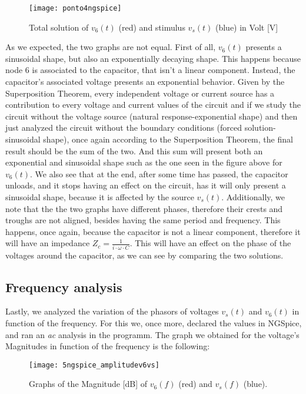 \FloatBarrier
\begin{figure}[h] \centering
	\texttt{[image: ponto4ngspice]}
	\caption{Total solution of $v_6(t)$ (red) and stimulus $v_s(t)$ (blue) in Volt [V]}
	\label{fig:sim4}
\end{figure}
\FloatBarrier

As we expected, the two graphs are not equal. First of all, $v_6(t)$ presents a sinusoidal shape, but also an exponentially decaying shape. This happens because node 6 is associated to the capacitor, that isn't a linear component. Instead, the capacitor's associated voltage presents an exponential behavior. Given by the Superposition Theorem, every independent voltage or current source has a contribution to every voltage and current values of the circuit and if we study the circuit without the voltage source (natural response-exponential shape) and then just analyzed the circuit without the boundary conditions (forced solution-sinusoidal shape), once again according to the Superposition Theorem, the final result should be the sum of the two. And this sum will present both an exponential and sinusoidal shape such as the one seen in the figure above for $v_6(t)$.
We also see that at the end, after some time has passed, the capacitor unloads, and it stops having an effect on the circuit, has it will only present a sinusoidal shape, because it is affected by the source $v_s(t)$.
Additionally, we note that the the two graphs have different phases, therefore their crests and troughs are not aligned, besides having the same period and frequency. This happens, once again, because the capacitor is not a linear component, therefore it will have an impedance $Z_{c}=\frac{1}{i\cdot \omega \cdot C}$. This will have an effect on the phase of the voltages around the capacitor, as we can see by comparing the two solutions.

\subsection{Frequency analysis}
Lastly, we analyzed the variation of the phasors of voltages $v_s(t)$ and $v_6(t)$ in function of the frequency. For this we, once more, declared the values in NGSpice, and ran an \textit{ac} analysis in the programm. The graph we obtained for the voltage's Magnitudes in function of the frequency is the following:

\FloatBarrier
\begin{figure}[h] \centering
	\texttt{[image: 5ngspice\_amplitudev6vs]}
	\caption{Graphs of the Magnitude [dB] of $v_6(f)$ (red) and $v_s(f)$ (blue).}
	\label{fig:sim5.1}
\end{figure}
\FloatBarrier

